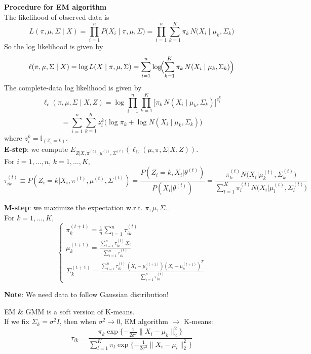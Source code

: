 \documentclass[12pt]{book}
\theoremstyle{definition}
\theoremstyle{remark}
\begin{document}
\textbf{Procedure for EM algorithm}\\
The likelihood of observed data is 
\[L(\pi,\mu,\Sigma\mid X)
= \prod_{i=1}^n P\bigl(X_i \mid \pi,\mu,\Sigma\bigr)
= \prod_{i=1}^n \sum_{k=1}^K \pi_k \, N\bigl(X_i \mid \mu_k,\Sigma_k\bigr)\]
So the log likelihood is given by
\[
\ell(\pi,\mu,\Sigma\mid X)
= \log L(X\mid \pi,\mu,\Sigma)
= \sum_{i=1}^n \log\!\Bigl(\sum_{k=1}^K \pi_k\, N(X_i\mid\mu_k, \Sigma_k)\Bigr)
\]
The complete-data log likelihood is given by
\[
\ell_c(\pi,\mu,\Sigma \mid X,Z)
= \log \prod_{i=1}^n \prod_{k=1}^K 
  \bigl[\pi_k\,N(X_i\mid\mu_k,\Sigma_k)\bigr]^{z_i^k}
\]\[= \sum_{i=1}^n \sum_{k=1}^K z_{i}^k
  \bigl(\log\pi_k + \log N(X_i\mid\mu_k,\Sigma_k)\bigr)
\]
where $z_i^k = \mathbb{I}_{(Z_i = k)}$.\\

\textbf{E-step}: we compute $E_{Z|X,\pi^{(t)},\mu^{(t)},\Sigma^{(t)}}(\ell_C(\mu,\pi,\Sigma|X,Z))$.\\
For $i = 1,\dots, n$, $k = 1,\dots, K$, 
\[\tau_{ik}^{(t)} \equiv P(Z_i =k|X_i,\pi^{(t)},\mu^{(t)},\Sigma^{(t)}) = \frac{P(Z_i = k,X_i|\theta^{(t)})}{P(X_i|\theta^{(t)})}= 
\frac{\pi_k^{(t)}N\bigl(X_i|\mu_k^{(t)},\Sigma_k^{(t)}\bigr)}
     {\sum_{l=1}^K \pi_{l}^{(t)} N\bigl(X_i|\mu_{l}^{(t)}, \Sigma_{l}^{(t)}\bigr)}
\]

\textbf{M-step}: we maximize the expectation w.r.t. $\pi, \mu, \Sigma$.\\
For $k = 1,\dots, K$,
\[\begin{cases}
    \pi_k^{(t+1)} = \frac{1}{n}\sum_{i=1}^n \tau_{ik}^{(t)}\\
    \mu_k^{(t+1)} = \frac{\sum_{i=1}^n \tau_{ik}^{(t)}\,X_i}
       {\sum_{i=1}^n \tau_{ik}^{(t)}}\\
    \Sigma_k^{(t+1)} = \frac{\sum_{i=1}^n \tau_{ik}^{(t)}\,(X_i-\mu_k^{(t+1)})(X_i-\mu_k^{(t+1)})^T}
       {\sum_{i=1}^n \tau_{ik}^{(t)}}
\end{cases}\]

\textbf{Note}: We need data to follow Gaussian distribution!

\begin{notionbox}[Remark]
    EM \& GMM is a soft version of K-means.\\
    If we fix $\Sigma_k = \sigma^2I$, then when $\sigma^2 \rightarrow 0$, EM algorithm $\rightarrow$ K-means:
    \[\tau_{ik} = \frac{\pi_k\exp\{-\frac1{2\sigma^2}\|X_i - \mu_k\|_2^2\}}
     {\sum_{l=1}^K\pi_l\exp\{-\frac1{2\sigma^2}\|X_i - \mu_l\|_2^2\}}\]
\end{notionbox}
\end{document}
